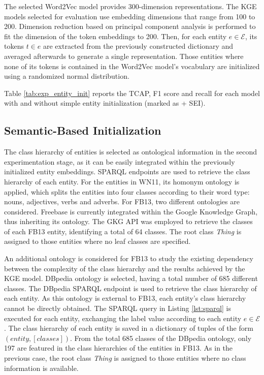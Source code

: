 The selected Word2Vec model provides 300-dimension representations. The KGE models selected for evaluation use embedding dimensions that range from 100 to 200. Dimension reduction based on principal component analysis is performed to fit the dimension of the token embeddings to 200. Then, for each entity $e \in \mathcal{E}$, its tokens $t \in e$ are extracted from the previously constructed dictionary and averaged afterwards to generate a single representation. Those entities where none of its tokens is contained in the Word2Vec model's vocabulary are initialized using a randomized normal distribution.

Table \ref{tab:exp_entity_init} reports the TCAP, F1 score and recall for each model with and without simple entity initialization (marked as + SEI).

\subsection{Semantic-Based Initialization}
The class hierarchy of entities is selected as ontological information in the second experimentation stage, as it can be easily integrated within the previously initialized entity embeddings. SPARQL endpoints are used to retrieve the class hierarchy of each entity. For the entities in WN11, its homonym ontology is applied, which splits the entities into four classes according to their word type: nouns, adjectives, verbs and adverbs. For FB13, two different ontologies are considered. Freebase is currently integrated within the Google Knowledge Graph, thus inheriting its ontology. The GKG API was employed to retrieve the classes of each FB13 entity, identifying a total of 64 classes. The root class \textit{Thing} is assigned to those entities where no leaf classes are specified.

An additional ontology is considered for FB13 to study the existing dependency between the complexity of the class hierarchy and the results achieved by the KGE model. DBpedia ontology is selected, having a total number of 685 different classes. The DBpedia SPARQL endpoint is used to retrieve the class hierarchy of each entity. As this ontology is external to FB13, each entity's class hierarchy cannot be directly obtained. The SPARQL query in Listing \ref{lst:sparql} is executed for each entity, exchanging the label value according to each entity $e \in \mathcal{E}$. The class hierarchy of each entity is saved in a dictionary of tuples of the form $(entity, [classes])$. From the total 685 classes of the DBpedia ontology, only 197 are featured in the class hierarchies of the entities in FB13. As in the previous case, the root class \textit{Thing} is assigned to those entities where no class information is available.

